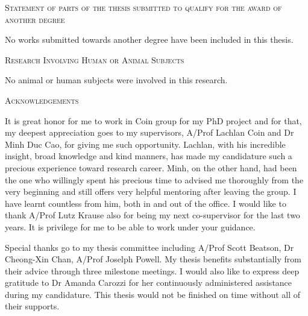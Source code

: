 \vspace{2cm}

\thispagestyle{plain}
\begin{center}
\Large \textsc{Statement of parts of the thesis submitted to qualify for the award of another degree}
\end{center}

No works submitted towards another degree have been included in this thesis.

\vspace{2cm}

\begin{center}
\Large \textsc{Research Involving Human or Animal Subjects}
\end{center}

No animal or human subjects were involved in this research.

\afterpage{\null\thispagestyle{empty}\newpage}
\newpage



\thispagestyle{plain}

\begin{center}
\Large \textsc{Acknowledgements}
\end{center}
It is great honor for me to work in Coin group for my PhD project and for that, my deepest appreciation goes to my supervisors, A/Prof Lachlan Coin and Dr Minh Duc Cao, for giving me such opportunity. Lachlan, with his incredible insight, broad knowledge and kind manners, has made my candidature such a precious experience toward research career. Minh, on the other hand, had been the one who willingly spent his precious time to advised me thoroughly from the very beginning and still offers very helpful mentoring after leaving the group. I have learnt countless from him, both in and out of the office.
I would like to thank A/Prof Lutz Krause also for being my next co-supervisor for the last two years. It is privilege for me to be able to work under your guidance.

\vspace{.3cm}

Special thanks go to my thesis committee including A/Prof Scott Beatson, Dr Cheong-Xin Chan, A/Prof Joselph Powell. My thesis benefits substantially from their advice through three milestone meetings. I would also like to express deep gratitude to Dr Amanda Carozzi for her continuously administered assistance during my candidature. This thesis would not be finished on time without all of their supports.

